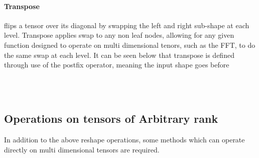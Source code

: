 \paragraph{Transpose} flips a tensor over its diagonal by swapping the left and
right sub-shape at each level.
Transpose applies swap to any non leaf nodes, allowing for any given 
function designed to operate on multi dimensional tenors, such as the FFT, to
do the same swap at each level.
It can be seen below that transpose is defined through use of the postfix operator, 
meaning the input shape goes before 
\begin{code}%
%
\>[2]\AgdaSpace{}%
\AgdaSymbol{:}\AgdaSpace{}%
\AgdaSpace{}%
\AgdaSpace{}%
\<%
\\
%
\>[2]\AgdaSpace{}%
\AgdaSymbol{(}\AgdaSpace{}%
%
\>[12]\AgdaSymbol{)}\AgdaSpace{}%
\AgdaSymbol{=}\AgdaSpace{}%
\AgdaSpace{}%
\<%
\\
%
\>[2]\AgdaSpace{}%
\AgdaSymbol{(}\AgdaSpace{}%
\AgdaSpace{}%
\AgdaSymbol{)}\AgdaSpace{}%
\AgdaSymbol{=}\AgdaSpace{}%
\AgdaSymbol{(}\AgdaSpace{}%
\AgdaSymbol{)}\AgdaSpace{}%
\AgdaSpace{}%
\AgdaSymbol{(}\AgdaSpace{}%
\AgdaSymbol{)}\<%
\end{code}


\subsection{Operations on tensors of Arbitrary rank}
In addition to the above reshape operations, some methods which can operate 
directly on multi dimensional tensors are required.
